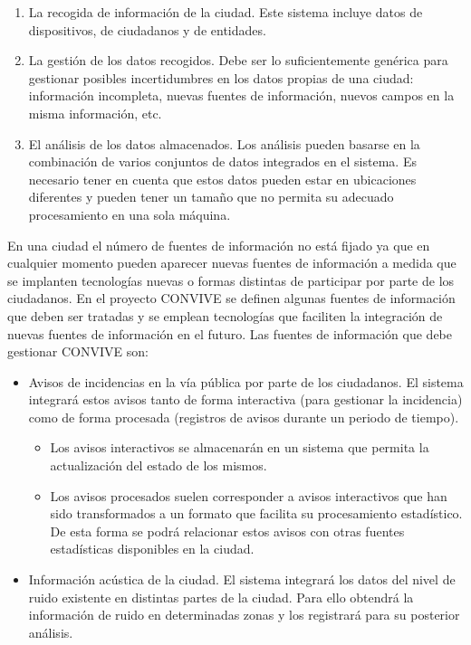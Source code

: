 \documentclass[
  a4paper,
]{scrreport}
\providecommand{\tightlist}{%
  \setlength{\itemsep}{0pt}\setlength{\parskip}{0pt}}\usepackage{longtable,booktabs,array}
\begin{document}
\begin{enumerate}
\def\labelenumi{\arabic{enumi}.}
\tightlist
\item
  La recogida de información de la ciudad. Este sistema incluye datos de
  dispositivos, de ciudadanos y de entidades.
\item
  La gestión de los datos recogidos. Debe ser lo suficientemente
  genérica para gestionar posibles incertidumbres en los datos propias
  de una ciudad: información incompleta, nuevas fuentes de información,
  nuevos campos en la misma información, etc.
\item
  El análisis de los datos almacenados. Los análisis pueden basarse en
  la combinación de varios conjuntos de datos integrados en el sistema.
  Es necesario tener en cuenta que estos datos pueden estar en
  ubicaciones diferentes y pueden tener un tamaño que no permita su
  adecuado procesamiento en una sola máquina.
\end{enumerate}

En una ciudad el número de fuentes de información no está fijado ya que
en cualquier momento pueden aparecer nuevas fuentes de información a
medida que se implanten tecnologías nuevas o formas distintas de
participar por parte de los ciudadanos. En el proyecto CONVIVE se
definen algunas fuentes de información que deben ser tratadas y se
emplean tecnologías que faciliten la integración de nuevas fuentes de
información en el futuro. Las fuentes de información que debe gestionar
CONVIVE son:

\begin{itemize}
\tightlist
\item
  Avisos de incidencias en la vía pública por parte de los ciudadanos.
  El sistema integrará estos avisos tanto de forma interactiva (para
  gestionar la incidencia) como de forma procesada (registros de avisos
  durante un periodo de tiempo).

  \begin{itemize}
  \tightlist
  \item
    Los avisos interactivos se almacenarán en un sistema que permita la
    actualización del estado de los mismos.
  \item
    Los avisos procesados suelen corresponder a avisos interactivos que
    han sido transformados a un formato que facilita su procesamiento
    estadístico. De esta forma se podrá relacionar estos avisos con
    otras fuentes estadísticas disponibles en la ciudad.
  \end{itemize}
\item
  Información acústica de la ciudad. El sistema integrará los datos del
  nivel de ruido existente en distintas partes de la ciudad. Para ello
  obtendrá la información de ruido en determinadas zonas y los
  registrará para su posterior análisis.
\end{itemize}
\end{document}

